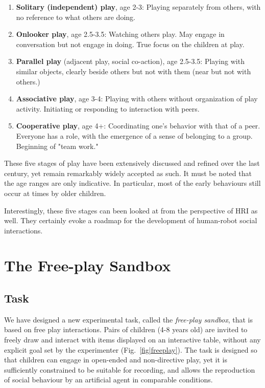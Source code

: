 \documentclass[sigconf]{acmart}
\begin{document}
\begin{enumerate}
    \item {\bf Solitary (independent) play}, age 2-3: Playing separately from
        others, with no reference to what others are doing.
    \item {\bf Onlooker play}, age 2.5-3.5: Watching others play. May engage in
        conversation but not engage in doing. True focus on the children at
        play.
    \item {\bf Parallel play} (adjacent play, social co-action), age 2.5-3.5: Playing
        with similar objects, clearly beside others but not with them (near
        but not with others.)
    \item {\bf Associative play}, age 3-4:  Playing with others without
        organization of play activity. Initiating or responding to
        interaction with peers. 
    \item {\bf Cooperative play}, age 4+: Coordinating one's behavior with that
        of a peer. Everyone has a role, with the emergence of a sense of
        belonging to a group. Beginning of "team work."
\end{enumerate}

These five stages of play have been extensively discussed and refined over the
last century, yet remain remarkably widely accepted as such. It must be noted
that the age ranges are only indicative. In particular, most of the early
behaviours still occur at times by older children.

Interestingly, these five stages can been looked at from the perspective of HRI
as well. They certainly evoke a roadmap for the development of human-robot
social interactions.




\section{The Free-play Sandbox}
\label{sec:freeplay}

\subsection{Task}

We have designed a new experimental task, called the \emph{free-play sandbox},
that is based on free play interactions. Pairs of children (4-8 years old) are
invited to freely draw and interact with items displayed on an interactive
table, without any explicit goal set by the experimenter
(Fig.~\ref{fig|freeplay}).  The task is designed so that children can engage in
open-ended and non-directive play, yet it is sufficiently constrained to be
suitable for recording, and allows the reproduction of social behaviour by an
artificial agent in comparable conditions.
\end{document}
